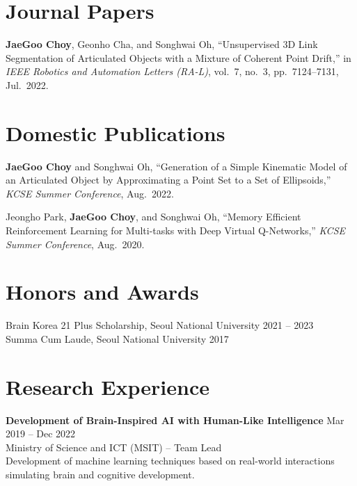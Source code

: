 \documentclass[10pt]{article}
\begin{document}
\section{Journal Papers}
\begin{enumerate}[label={[J\arabic*]}, leftmargin=2.5em, itemsep=4pt]
  \item \textbf{JaeGoo Choy}, Geonho Cha, and Songhwai Oh,
  ``Unsupervised 3D Link Segmentation of Articulated Objects with a Mixture of Coherent Point Drift,''
  in \textit{IEEE Robotics and Automation Letters (RA-L)}, vol.~7, no.~3, pp.~7124--7131, Jul.\ 2022.
\end{enumerate}

\section{Domestic Publications}
\begin{enumerate}[label={[D\arabic*]}, leftmargin=2.5em, itemsep=4pt]
  \setcounter{enumi}{1}
  \item \textbf{JaeGoo Choy} and Songhwai Oh,
  ``Generation of a Simple Kinematic Model of an Articulated Object by Approximating a Point Set to a Set of Ellipsoids,''
  \textit{KCSE Summer Conference}, Aug.\ 2022.

  \setcounter{enumi}{0}
  \item Jeongho Park, \textbf{JaeGoo Choy}, and Songhwai Oh,
  ``Memory Efficient Reinforcement Learning for Multi-tasks with Deep Virtual Q-Networks,''
  \textit{KCSE Summer Conference}, Aug.\ 2020.
\end{enumerate}

\section{Honors and Awards}
Brain Korea 21 Plus Scholarship, Seoul National University \hfill 2021 -- 2023 \\
Summa Cum Laude, Seoul National University \hfill 2017

\section{Research Experience}
\textbf{Development of Brain-Inspired AI with Human-Like Intelligence} \hfill Mar 2019 -- Dec 2022 \\
Ministry of Science and ICT (MSIT) -- Team Lead \\
Development of machine learning techniques based on real-world interactions simulating brain and cognitive development.
\end{document}
